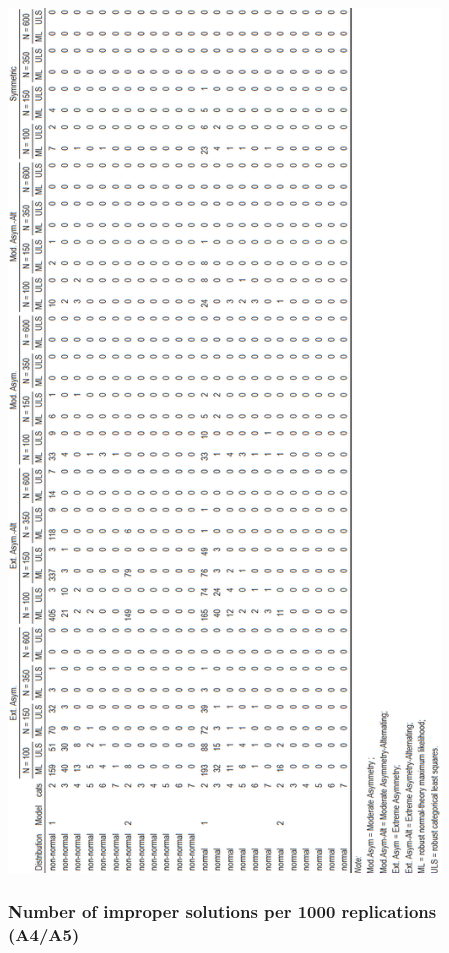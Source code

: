 \documentclass[10,a4paperpaper,]{article}
\begin{document}
\includegraphics[width=325pt]{./figures/tabA2_A3}

\subsubsection{Number of improper solutions per 1000 replications (A4/A5)}
\end{document}
